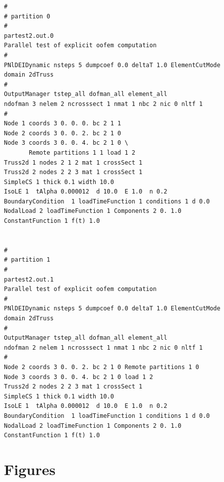 \documentclass[a4paper]{article}
\begin{document}
\begin{verbatim}
#
# partition 0
#
partest2.out.0
Parallel test of explicit oofem computation
#
PNlDEIDynamic nsteps 5 dumpcoef 0.0 deltaT 1.0 ElementCutMode
domain 2dTruss
#
OutputManager tstep_all dofman_all element_all
ndofman 3 nelem 2 ncrosssect 1 nmat 1 nbc 2 nic 0 nltf 1
#
Node 1 coords 3 0. 0. 0. bc 2 1 1
Node 2 coords 3 0. 0. 2. bc 2 1 0
Node 3 coords 3 0. 0. 4. bc 2 1 0 \
       Remote partitions 1 1 load 1 2
Truss2d 1 nodes 2 1 2 mat 1 crossSect 1
Truss2d 2 nodes 2 2 3 mat 1 crossSect 1
SimpleCS 1 thick 0.1 width 10.0
IsoLE 1  tAlpha 0.000012  d 10.0  E 1.0  n 0.2
BoundaryCondition  1 loadTimeFunction 1 conditions 1 d 0.0
NodalLoad 2 loadTimeFunction 1 Components 2 0. 1.0
ConstantFunction 1 f(t) 1.0


#
# partition 1
#
partest2.out.1
Parallel test of explicit oofem computation
#
PNlDEIDynamic nsteps 5 dumpcoef 0.0 deltaT 1.0 ElementCutMode
domain 2dTruss
#
OutputManager tstep_all dofman_all element_all
ndofman 2 nelem 1 ncrosssect 1 nmat 1 nbc 2 nic 0 nltf 1
#
Node 2 coords 3 0. 0. 2. bc 2 1 0 Remote partitions 1 0
Node 3 coords 3 0. 0. 4. bc 2 1 0 load 1 2
Truss2d 2 nodes 2 2 3 mat 1 crossSect 1
SimpleCS 1 thick 0.1 width 10.0
IsoLE 1  tAlpha 0.000012  d 10.0  E 1.0  n 0.2
BoundaryCondition  1 loadTimeFunction 1 conditions 1 d 0.0
NodalLoad 2 loadTimeFunction 1 Components 2 0. 1.0
ConstantFunction 1 f(t) 1.0
\end{verbatim}

\section{Figures}
\end{document}
